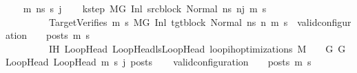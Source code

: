 \begin{isabellebody}
\ \ \isamarkupfalse%
\ m{\isacharprime}{\kern0pt}\ ns\ s{\isacharprime}{\kern0pt}\ j\isanewline
\ \ \isamarkupfalse%
\ k{\isacharunderscore}{\kern0pt}step{\isacharcolon}{\kern0pt}\ {\isachardoublequoteopen}M{\isacharcomma}{\kern0pt}{\isasymLambda}{\isacharcomma}{\kern0pt}{\isasymGamma}{\isacharcomma}{\kern0pt}{\isasymOmega}{\isacharcomma}{\kern0pt}G\ {\isasymturnstile}{\isacharparenleft}{\kern0pt}Inl\ src{\isacharunderscore}{\kern0pt}block{\isacharcomma}{\kern0pt}\ Normal\ ns{\isacharparenright}{\kern0pt}\ {\isacharminus}{\kern0pt}n{\isasymrightarrow}{\isacharcircum}{\kern0pt}j\ {\isacharparenleft}{\kern0pt}m{\isacharprime}{\kern0pt}{\isacharcomma}{\kern0pt}\ s{\isacharprime}{\kern0pt}{\isacharparenright}{\kern0pt}{\isachardoublequoteclose}\ \isanewline
\ \ \ \ \ \ \ \ \ TargetVerifies{\isacharcolon}{\kern0pt}\ {\isachardoublequoteopen}{\isasymforall}m{}{\isacharprime}{\kern0pt}\ s{}{\isacharprime}{\kern0pt}{\isachardot}{\kern0pt}\ {\isacharparenleft}{\kern0pt}M{\isacharcomma}{\kern0pt}{\isasymLambda}{\isacharcomma}{\kern0pt}{\isasymGamma}{\isacharcomma}{\kern0pt}{\isasymOmega}{\isacharcomma}{\kern0pt}G{\isacharprime}{\kern0pt}\ {\isasymturnstile}{\isacharparenleft}{\kern0pt}Inl\ tgt{\isacharunderscore}{\kern0pt}block{\isacharcomma}{\kern0pt}\ Normal\ ns{\isacharparenright}{\kern0pt}\ {\isacharminus}{\kern0pt}n{\isasymrightarrow}{\isacharasterisk}{\kern0pt}\ {\isacharparenleft}{\kern0pt}m{}{\isacharprime}{\kern0pt}{\isacharcomma}{\kern0pt}\ s{}{\isacharprime}{\kern0pt}{\isacharparenright}{\kern0pt}{\isacharparenright}{\kern0pt}\ {\isasymlongrightarrow}\ valid{\isacharunderscore}{\kern0pt}configuration\ {\isasymLambda}\ {\isasymGamma}\ {\isasymOmega}\ posts\ m{}{\isacharprime}{\kern0pt}\ s{}{\isacharprime}{\kern0pt}{\isachardoublequoteclose}\ \isanewline
\ \ \ \ \ \ \ \ \ IH{\isacharcolon}{\kern0pt}\ {\isachardoublequoteopen}{\isasymforall}{\isacharparenleft}{\kern0pt}LoopHead{\isacharcomma}{\kern0pt}\ LoopHead{\isacharprime}{\kern0pt}{\isacharparenright}{\kern0pt}{\isasymin}lsLoopHead{\isachardot}{\kern0pt}\ loop{\isacharunderscore}{\kern0pt}ih{\isacharunderscore}{\kern0pt}optimizations\ M\ {\isasymLambda}\ {\isasymGamma}\ {\isasymOmega}\ G\ G{\isacharprime}{\kern0pt}\ LoopHead\ LoopHead{\isacharprime}{\kern0pt}\ m{\isacharprime}{\kern0pt}\ s{\isacharprime}{\kern0pt}\ j\ posts{\isachardoublequoteclose}\isanewline
\ \ \isamarkupfalse%
\ {\isachardoublequoteopen}valid{\isacharunderscore}{\kern0pt}configuration\ {\isasymLambda}\ {\isasymGamma}\ {\isasymOmega}\ posts\ m{\isacharprime}{\kern0pt}\ s{\isacharprime}{\kern0pt}{\isachardoublequoteclose}\ \isamarkupfalse%

\end{isabellebody}
